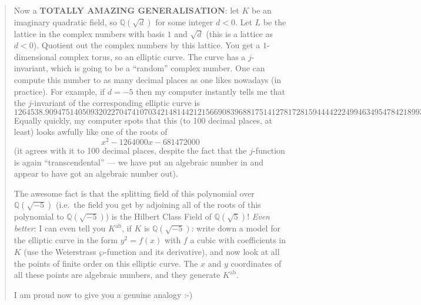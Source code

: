 \documentclass{article}
\begin{document}
\begin{quote}
Now a \textbf{TOTALLY AMAZING GENERALISATION}: let \(K\) be an imaginary
quadratic field, so \(\mathbb{Q}(\sqrt{d})\) for some integer \(d<0\).
Let \(L\) be the lattice in the complex numbers with basis \(1\) and
\(\sqrt{d}\) (this is a lattice as \(d<0\)). Quotient out the complex
numbers by this lattice. You get a \(1\)-dimensional complex torus, so
an elliptic curve. The curve has a \(j\)-invariant, which is going to be
a ``random'' complex number. One can compute this number to as many
decimal places as one likes nowadays (in practice). For example, if
\(d=-5\) then my computer instantly tells me that the \(j\)-invariant of
the corresponding elliptic curve is
\[1264538.90947514050932022704741070342148144212156690839688175141278172815944442224994634954784218993\ldots\]
Equally quickly, my computer spots that this (to 100 decimal places, at
least) looks awfully like one of the roots of
\[x^2 - 1264000x - 681472000\] (it agrees with it to 100 decimal places,
despite the fact that the \(j\)-function is again ``transcendental'' ---
we have put an algebraic number in and appear to have got an algebraic
number out).

The awesome fact is that the splitting field of this polynomial over
\(\mathbb{Q}(\sqrt{-5})\) (i.e.~the field you get by adjoining all of
the roots of this polynomial to \(\mathbb{Q}(\sqrt{-5})\)) is the
Hilbert Class Field of \(\mathbb{Q}(\sqrt{5})\)! \emph{Even better}: I
can even tell you \(K^{\mathrm{ab}}\), if \(K\) is
\(\mathbb{Q}(\sqrt{-5})\): write down a model for the elliptic curve in
the form \(y^2=f(x)\) with \(f\) a cubic with coefficients in \(K\) (use
the Weierstrass \(\wp\)-function and its derivative), and now look at
all the points of finite order on this elliptic curve. The \(x\) and
\(y\) coordinates of all these points are algebraic numbers, and they
generate \(K^{\mathrm{ab}}\).

I am proud now to give you a genuine analogy :-)


\end{quote}
\end{document}
